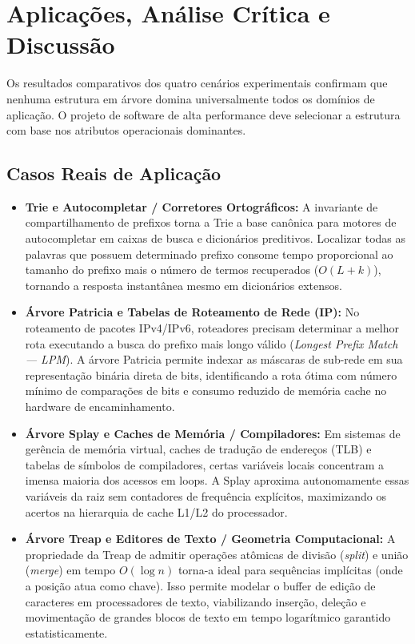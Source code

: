 \documentclass[11pt,a4paper]{article}
\newcommand{\Ogrande}[1]{\ensuremath{O\!\left(#1\right)}}
\begin{document}
\section{Aplicações, Análise Crítica e Discussão}

Os resultados comparativos dos quatro cenários experimentais confirmam que nenhuma estrutura em árvore domina universalmente todos os domínios de aplicação. O projeto de software de alta performance deve selecionar a estrutura com base nos atributos operacionais dominantes.

\subsection{Casos Reais de Aplicação}
\begin{itemize}[leftmargin=*]
  \item \textbf{Trie e Autocompletar / Corretores Ortográficos:} A invariante de compartilhamento de prefixos torna a Trie a base canônica para motores de autocompletar em caixas de busca e dicionários preditivos. Localizar todas as palavras que possuem determinado prefixo consome tempo proporcional ao tamanho do prefixo mais o número de termos recuperados ($\Ogrande{L + k}$), tornando a resposta instantânea mesmo em dicionários extensos.
  \item \textbf{Árvore Patricia e Tabelas de Roteamento de Rede (IP):} No roteamento de pacotes IPv4/IPv6, roteadores precisam determinar a melhor rota executando a busca do prefixo mais longo válido (\textit{Longest Prefix Match --- LPM}). A árvore Patricia permite indexar as máscaras de sub-rede em sua representação binária direta de bits, identificando a rota ótima com número mínimo de comparações de bits e consumo reduzido de memória cache no hardware de encaminhamento.
  \item \textbf{Árvore Splay e Caches de Memória / Compiladores:} Em sistemas de gerência de memória virtual, caches de tradução de endereços (TLB) e tabelas de símbolos de compiladores, certas variáveis locais concentram a imensa maioria dos acessos em loops. A Splay aproxima autonomamente essas variáveis da raiz sem contadores de frequência explícitos, maximizando os acertos na hierarquia de cache L1/L2 do processador.
  \item \textbf{Árvore Treap e Editores de Texto / Geometria Computacional:} A propriedade da Treap de admitir operações atômicas de divisão (\textit{split}) e união (\textit{merge}) em tempo $\Ogrande{\log n}$ torna-a ideal para sequências implícitas (onde a posição atua como chave). Isso permite modelar o buffer de edição de caracteres em processadores de texto, viabilizando inserção, deleção e movimentação de grandes blocos de texto em tempo logarítmico garantido estatisticamente.

\end{itemize}
\end{document}
